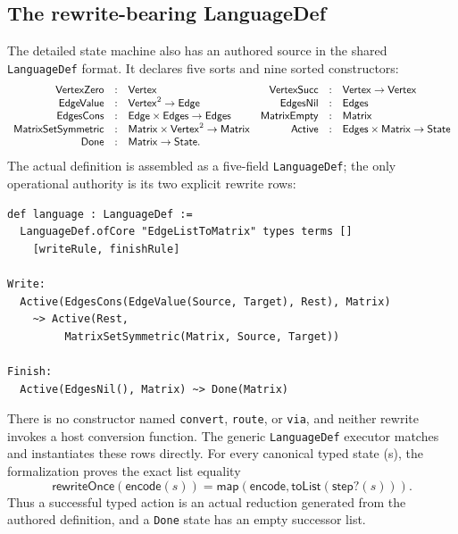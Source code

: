 \documentclass[11pt]{article}
\theoremstyle{remark}
\newcommand{\code}[1]{\texttt{#1}}
\begin{document}
\subsection{The rewrite-bearing LanguageDef}
\label{sec:matrix-langdef}

The detailed state machine also has an authored source in the shared
\code{LanguageDef} format.  It declares five sorts and nine sorted
constructors:
\[
\begin{array}{rcl@{\quad}rcl}
\mathsf{VertexZero}&:&\mathsf{Vertex} &
\mathsf{VertexSucc}&:&\mathsf{Vertex}\to\mathsf{Vertex}\\
\mathsf{EdgeValue}&:&\mathsf{Vertex}^2\to\mathsf{Edge} &
\mathsf{EdgesNil}&:&\mathsf{Edges}\\
\mathsf{EdgesCons}&:&\mathsf{Edge}\times\mathsf{Edges}\to\mathsf{Edges} &
\mathsf{MatrixEmpty}&:&\mathsf{Matrix}\\
\mathsf{MatrixSetSymmetric}&:&
  \mathsf{Matrix}\times\mathsf{Vertex}^2\to\mathsf{Matrix} &
\mathsf{Active}&:&\mathsf{Edges}\times\mathsf{Matrix}\to\mathsf{State}\\
\mathsf{Done}&:&\mathsf{Matrix}\to\mathsf{State}.&&
\end{array}
\]
The actual definition is assembled as a five-field \code{LanguageDef}; the
only operational authority is its two explicit rewrite rows:
\begin{lstlisting}[style=graphlang,language={}]
def language : LanguageDef :=
  LanguageDef.ofCore "EdgeListToMatrix" types terms []
    [writeRule, finishRule]

Write:
  Active(EdgesCons(EdgeValue(Source, Target), Rest), Matrix)
    ~> Active(Rest,
         MatrixSetSymmetric(Matrix, Source, Target))

Finish:
  Active(EdgesNil(), Matrix) ~> Done(Matrix)
\end{lstlisting}
There is no constructor named \code{convert}, \code{route}, or \code{via},
and neither rewrite invokes a host conversion function.  The generic
\code{LanguageDef} executor matches and instantiates these rows directly.
For every canonical typed state (s), the formalization proves the exact list
equality
\[
  \mathsf{rewriteOnce}(\mathsf{encode}(s))
  = \mathsf{map}(\mathsf{encode},\mathsf{toList}(\mathsf{step?}(s))).
\]
Thus a successful typed action is an actual reduction generated from the
authored definition, and a \code{Done} state has an empty successor list.
\end{document}
